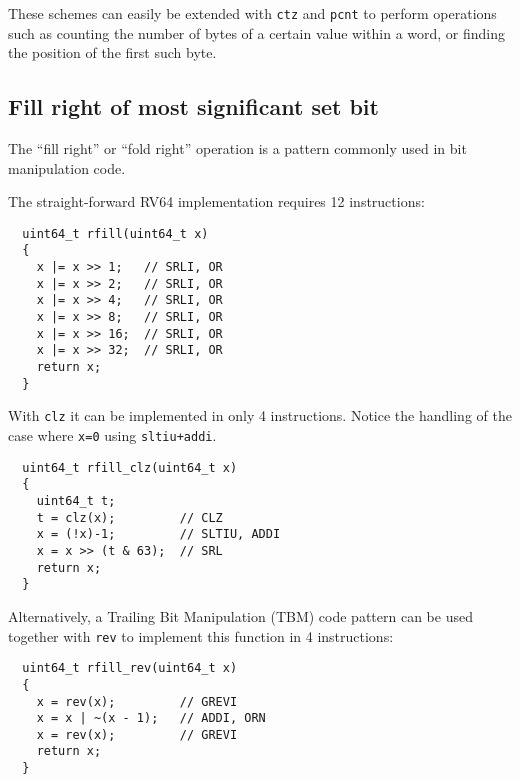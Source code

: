 These schemes can easily be extended with {\tt ctz} and {\tt pcnt} to perform
operations such as counting the number of bytes of a certain value within a
word, or finding the position of the first such byte.


\subsection{Fill right of most significant set bit}

The ``fill right'' or ``fold right'' operation is a pattern commonly used in bit manipulation code.~\cite{MAGIC}

The straight-forward RV64 implementation requires 12 instructions:

\begin{minipage}{\linewidth}
\begin{verbatim}
  uint64_t rfill(uint64_t x)
  {
    x |= x >> 1;   // SRLI, OR
    x |= x >> 2;   // SRLI, OR
    x |= x >> 4;   // SRLI, OR
    x |= x >> 8;   // SRLI, OR
    x |= x >> 16;  // SRLI, OR
    x |= x >> 32;  // SRLI, OR
    return x;
  }
\end{verbatim}
\end{minipage}

With {\tt clz} it can be implemented in only 4 instructions. Notice the
handling of the case where {\tt x=0} using {\tt sltiu+addi}.

\begin{minipage}{\linewidth}
\begin{verbatim}
  uint64_t rfill_clz(uint64_t x)
  {
    uint64_t t;
    t = clz(x);         // CLZ
    x = (!x)-1;         // SLTIU, ADDI
    x = x >> (t & 63);  // SRL
    return x;
  }
\end{verbatim}
\end{minipage}

Alternatively, a Trailing Bit Manipulation (TBM) code pattern can be used
together with {\tt rev} to implement this function in 4 instructions:

\begin{minipage}{\linewidth}
\begin{verbatim}
  uint64_t rfill_rev(uint64_t x)
  {
    x = rev(x);         // GREVI
    x = x | ~(x - 1);   // ADDI, ORN
    x = rev(x);         // GREVI
    return x;
  }
\end{verbatim}
\end{minipage}

